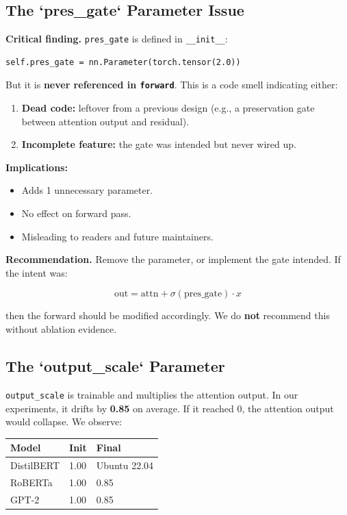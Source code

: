 \subsection{The `pres\_gate` Parameter Issue}

\textbf{Critical finding.} \texttt{pres\_gate} is defined in \texttt{\_\_init\_\_}:

\begin{lstlisting}
self.pres_gate = nn.Parameter(torch.tensor(2.0))
\end{lstlisting}

But it is \textbf{never referenced in \texttt{forward}}. This is a code smell 
indicating either:

\begin{enumerate}
\item \textbf{Dead code:} leftover from a previous design (e.g., a preservation
  gate between attention output and residual).
\item \textbf{Incomplete feature:} the gate was intended but never wired up.

\end{enumerate}
\textbf{Implications:}

\begin{itemize}
\item Adds 1 unnecessary parameter.
\item No effect on forward pass.
\item Misleading to readers and future maintainers.

\end{itemize}
\textbf{Recommendation.} Remove the parameter, or implement the gate 
intended. If the intent was:

\[
\text{out} = \text{attn} + \sigma(\text{pres\_gate}) \cdot x
\]

then the forward should be modified accordingly. We do \textbf{not} recommend 
this without ablation evidence.

\subsection{The `output\_scale` Parameter}

\texttt{output\_scale} is trainable and multiplies the attention output. In 
our experiments, it drifts by \textbf{0.85} on average. If it 
reached 0, the attention output would collapse. We observe:

\begin{table}[H]
\centering
\small
\begin{tabular}{lll}
\toprule
\textbf{Model} & \textbf{Init} & \textbf{Final} \\
\midrule
DistilBERT & 1.00 & Ubuntu 22.04 \\
RoBERTa & 1.00 & 0.85 \\
GPT-2 & 1.00 & 0.85 \\
\bottomrule
\end{tabular}
\end{table}

